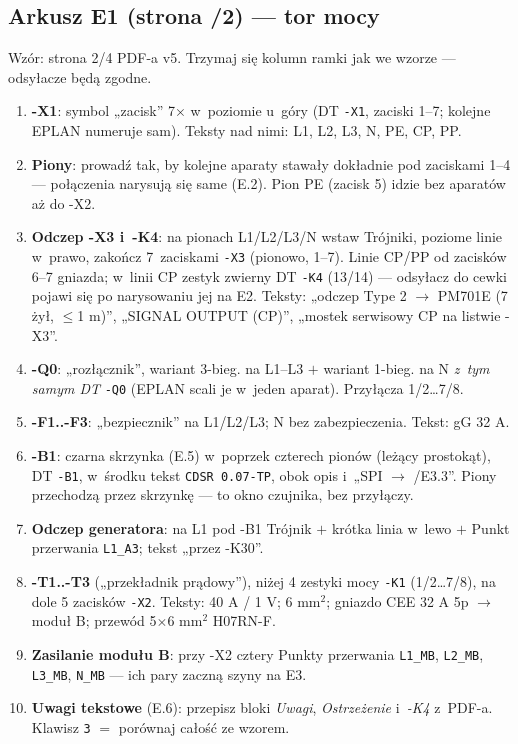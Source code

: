 \documentclass[11pt,a4paper]{article}
\begin{document}
\subsection{Arkusz E1 (strona /2) --- tor mocy}
Wzór: strona 2/4 PDF-a v5. Trzymaj się kolumn ramki jak we wzorze --- odsyłacze będą zgodne.
\begin{enumerate}
\item \textbf{-X1}: symbol „zacisk'' 7$\times$ w~poziomie u~góry (DT \texttt{-X1}, zaciski 1--7;
kolejne EPLAN numeruje sam). Teksty nad nimi: L1, L2, L3, N, PE, CP, PP.
\item \textbf{Piony}: prowadź tak, by kolejne aparaty stawały dokładnie pod zaciskami 1--4 ---
połączenia narysują się same (E.2). Pion PE (zacisk 5) idzie bez aparatów aż do -X2.
\item \textbf{Odczep -X3 i~-K4}: na pionach L1/L2/L3/N wstaw Trójniki, poziome linie w~prawo, zakończ
7~zaciskami \texttt{-X3} (pionowo, 1--7). Linie CP/PP od zacisków 6--7 gniazda; w~linii CP zestyk
zwierny DT \texttt{-K4} (13/14) --- odsyłacz do cewki pojawi się po narysowaniu jej na E2. Teksty:
„odczep Type 2 $\to$ PM701E (7 żył, $\le$1 m)'', „SIGNAL OUTPUT (CP)'', „mostek serwisowy CP na
listwie -X3''.
\item \textbf{-Q0}: „rozłącznik'', wariant 3-bieg. na L1--L3 $+$ wariant 1-bieg. na N \emph{z~tym samym
DT} \texttt{-Q0} (EPLAN scali je w~jeden aparat). Przyłącza 1/2\ldots7/8.
\item \textbf{-F1..-F3}: „bezpiecznik'' na L1/L2/L3; N bez zabezpieczenia. Tekst: gG 32 A.
\item \textbf{-B1}: czarna skrzynka (E.5) w~poprzek czterech pionów (leżący prostokąt), DT \texttt{-B1},
w~środku tekst \texttt{CDSR 0.07-TP}, obok opis i~„SPI $\to$ /E3.3''. Piony przechodzą przez skrzynkę ---
to okno czujnika, bez przyłączy.
\item \textbf{Odczep generatora}: na L1 pod -B1 Trójnik $+$ krótka linia w~lewo $+$ Punkt przerwania
\texttt{L1\_A3}; tekst „przez -K30''.
\item \textbf{-T1..-T3} („przekładnik prądowy''), niżej 4 zestyki mocy \texttt{-K1} (1/2\ldots7/8),
na dole 5 zacisków \texttt{-X2}. Teksty: 40 A / 1 V; 6 mm$^2$; gniazdo CEE 32 A 5p $\to$ moduł B;
przewód 5$\times$6 mm$^2$ H07RN-F.
\item \textbf{Zasilanie modułu B}: przy -X2 cztery Punkty przerwania \texttt{L1\_MB}, \texttt{L2\_MB},
\texttt{L3\_MB}, \texttt{N\_MB} --- ich pary zaczną szyny na E3.
\item \textbf{Uwagi tekstowe} (E.6): przepisz bloki \emph{Uwagi}, \emph{Ostrzeżenie} i~\emph{-K4}
z~PDF-a. Klawisz \texttt{3} $=$ porównaj całość ze wzorem.
\end{enumerate}
\end{document}
